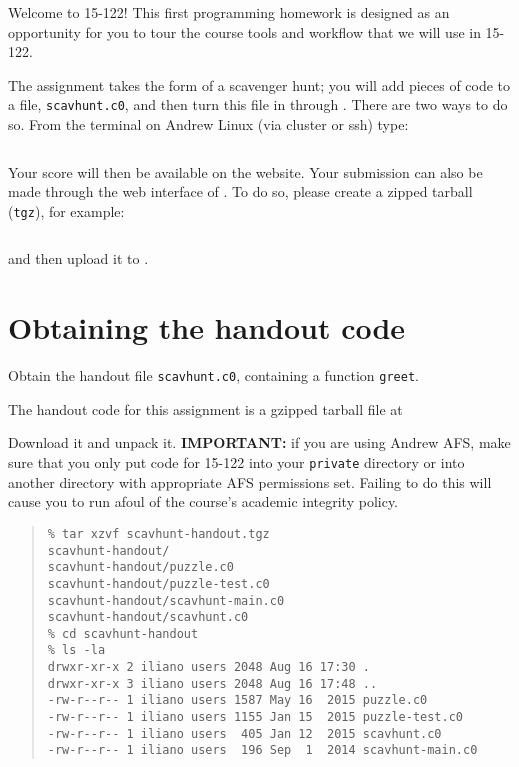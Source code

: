 \documentclass[12pt]{exam}
\begin{document}
\hwTitle

\noindent
Welcome to 15-122!  This first programming homework is designed
as an opportunity for you to tour the course tools and
workflow that we will use in 15-122.

The assignment takes the form of a scavenger hunt; you will add pieces
of code to a file, \lstinline'scavhunt.c0', and then turn this file in
through \autolab. There are two ways to do so. From the terminal on
Andrew Linux (via cluster or ssh) type:
\begin{quote}
\begin{lstlisting}[language={[coin]C}]
% handin scavhunt scavhunt.c0 puzzle.c0
\end{lstlisting}
\end{quote}
Your score will then be available on the \autolab{} website.
Your submission can also be made through the web interface of \autolab.
To do so, please create a zipped tarball (\lstinline'tgz'), for example:
\begin{quote}
\begin{lstlisting}[language={[coin]C}]
% tar -czvf handin.tgz scavhunt.c0 puzzle.c0
\end{lstlisting}
\end{quote}
and then upload it to \autolab.


\clearpage
\section{Obtaining the handout code}

\vspace{-\bigskipamount}
\begin{task}[2]
 Obtain the handout file \lstinline'scavhunt.c0',
containing a function \lstinline'greet'.
\end{task}

The handout code for this assignment is a gzipped tarball file at
\begin{center}
\end{center}
Download it and unpack it.  \textbf{IMPORTANT:} if you are using
Andrew AFS, make sure that you only put code for 15-122 into your
\lstinline'private' directory or into another directory with
appropriate AFS permissions set. Failing to do this will cause you to
run afoul of the course's academic integrity policy.

\begin{quote}
\begin{lstlisting}[language={[coin]C},mathescape=false]
% cd $HOME/private/15122
% tar xzvf scavhunt-handout.tgz
scavhunt-handout/
scavhunt-handout/puzzle.c0
scavhunt-handout/puzzle-test.c0
scavhunt-handout/scavhunt-main.c0
scavhunt-handout/scavhunt.c0
% cd scavhunt-handout
% ls -la
drwxr-xr-x 2 iliano users 2048 Aug 16 17:30 .
drwxr-xr-x 3 iliano users 2048 Aug 16 17:48 ..
-rw-r--r-- 1 iliano users 1587 May 16  2015 puzzle.c0
-rw-r--r-- 1 iliano users 1155 Jan 15  2015 puzzle-test.c0
-rw-r--r-- 1 iliano users  405 Jan 12  2015 scavhunt.c0
-rw-r--r-- 1 iliano users  196 Sep  1  2014 scavhunt-main.c0
\end{lstlisting}
\end{quote}
\end{document}
